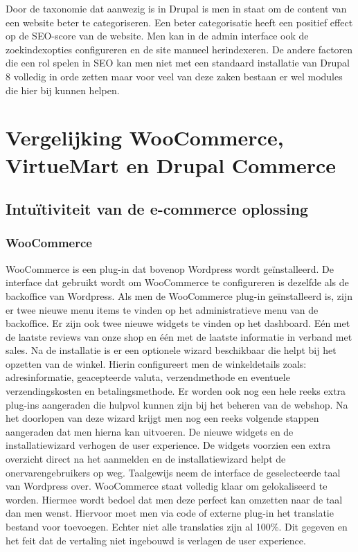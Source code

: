 Door de taxonomie dat aanwezig is in Drupal is men in staat om de content van een website beter te categoriseren. Een beter categorisatie heeft een positief effect op de SEO-score van de website. Men kan in de admin interface ook de zoekindexopties configureren en de site manueel herindexeren. De andere factoren die een rol spelen in SEO kan men niet met een standaard installatie van Drupal 8 volledig in orde zetten maar voor veel van deze zaken bestaan er wel modules die hier bij kunnen helpen.
\section{Vergelijking WooCommerce, VirtueMart en Drupal Commerce }
\subsection{Intuïtiviteit van de e-commerce oplossing}
\subsubsection{WooCommerce}
WooCommerce is een plug-in dat bovenop Wordpress wordt geïnstalleerd. De interface dat gebruikt wordt om WooCommerce te configureren is dezelfde als de backoffice van Wordpress. Als men de WooCommerce plug-in geïnstalleerd is, zijn er twee nieuwe menu items te vinden op het administratieve menu van de backoffice. Er zijn ook twee nieuwe widgets te vinden op het dashboard. Eén met de laatste reviews van onze shop en één met de laatste informatie in verband met sales. Na de installatie is er een optionele wizard beschikbaar die helpt bij het opzetten van de winkel. Hierin configureert men de winkeldetails zoals: adresinformatie, geacepteerde valuta, verzendmethode en eventuele verzendingskosten en betalingsmethode. Er worden ook nog een hele reeks extra plug-ins aangeraden die hulpvol kunnen zijn bij het beheren van de webshop. Na het doorlopen van deze wizard krijgt men nog een reeks volgende stappen aangeraden dat men hierna kan uitvoeren. De nieuwe widgets en de installatiewizard verhogen de user experience. De widgets voorzien een extra overzicht direct na het aanmelden en de installatiewizard helpt de onervarengebruikers op weg. Taalgewijs neem de interface de geselecteerde taal van Wordpress over. WooCommerce staat volledig klaar om gelokaliseerd te worden. Hiermee wordt bedoel dat men deze perfect kan omzetten naar de taal dan men wenst. Hiervoor moet men via code of externe plug-in het translatie bestand voor toevoegen. Echter niet alle translaties zijn al 100\%. Dit gegeven en het feit dat de vertaling niet ingebouwd is verlagen de user experience.
